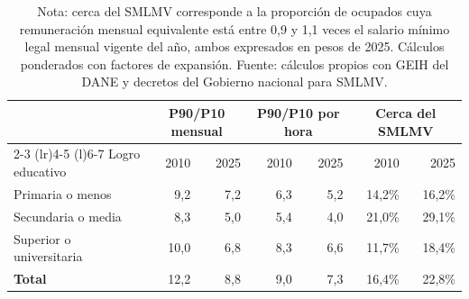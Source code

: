 \begin{table}[H]
\centering
\caption{Dispersión y masa alrededor del salario mínimo por logro educativo, 2010 y 2025}
\label{tab:masa_smlmv_educacion}
\begingroup
\setlength{\tabcolsep}{3.5pt}
\scriptsize
\begin{tabular}{@{}p{3.5cm}rrrrrr@{}}
\toprule
& \multicolumn{2}{c}{P90/P10 mensual} & \multicolumn{2}{c}{P90/P10 por hora} & \multicolumn{2}{c}{Cerca del SMLMV} \\
\cmidrule(lr){2-3} \cmidrule(lr){4-5} \cmidrule(l){6-7}
Logro educativo & 2010 & 2025 & 2010 & 2025 & 2010 & 2025 \\
\midrule
Primaria o menos & 9,2 & 7,2 & 6,3 & 5,2 & 14,2\% & 16,2\% \\
Secundaria o media & 8,3 & 5,0 & 5,4 & 4,0 & 21,0\% & 29,1\% \\
Superior o universitaria & 10,0 & 6,8 & 8,3 & 6,6 & 11,7\% & 18,4\% \\
\midrule
\textbf{Total} & 12,2 & 8,8 & 9,0 & 7,3 & 16,4\% & 22,8\% \\
\bottomrule
\end{tabular}
\endgroup
\caption*{\footnotesize Nota: cerca del SMLMV corresponde a la proporción de ocupados cuya remuneración mensual equivalente está entre 0,9 y 1,1 veces el salario mínimo legal mensual vigente del año, ambos expresados en pesos de 2025. Cálculos ponderados con factores de expansión. Fuente: cálculos propios con GEIH del DANE y decretos del Gobierno nacional para SMLMV.}
\end{table}

